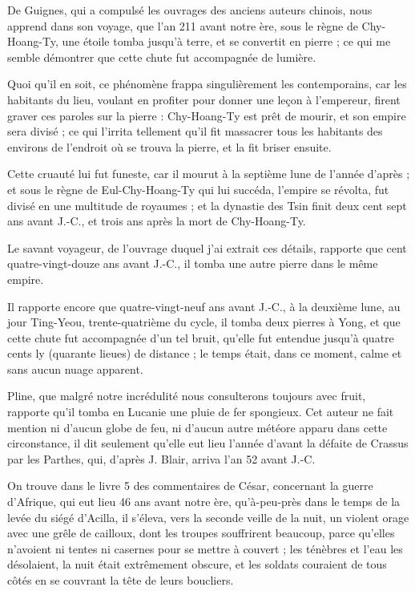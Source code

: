 \documentclass[a4paper, 12pt, oneside, french]{article}
\begin{document}
De Guignes, qui a compulsé les ouvrages des anciens auteurs chinois, nous apprend dans son voyage, que l'an 211 avant notre ère, sous le règne de Chy-Hoang-Ty, une étoile tomba jusqu'à terre, et se convertit en pierre ; ce qui me semble démontrer que cette chute fut accompagnée de lumière.

Quoi qu'il en soit, ce phénomène frappa singulièrement les contemporains, car les habitants du lieu, voulant en profiter pour donner une leçon à l'empereur, firent graver ces paroles sur la pierre : \og Chy-Hoang-Ty est prêt de mourir, et son empire sera divisé ; \fg ce qui l'irrita tellement qu'il fit massacrer tous les habitants des environs de l'endroit où se trouva la pierre, et la fit briser ensuite.

Cette cruauté lui fut funeste, car il mourut à la septième lune de l'année d'après ; et sous le règne de Eul-Chy-Hoang-Ty qui lui succéda, l'empire se révolta, fut divisé en une multitude de royaumes ; et la dynastie des Tsin finit deux cent sept ans avant J.-C., et trois ans après la mort de Chy-Hoang-Ty.

Le savant voyageur, de l'ouvrage duquel j'ai extrait ces détails, rapporte que cent quatre-vingt-douze ans avant J.-C., il tomba une autre pierre dans le même empire.

Il rapporte encore que quatre-vingt-neuf ans avant J.-C., à la deuxième lune, au jour Ting-Yeou, trente-quatrième du cycle, il tomba deux pierres à Yong, et que cette chute fut accompagnée d'un tel bruit, qu'elle fut entendue jusqu'à quatre cents ly (quarante lieues) de distance ; le temps était, dans ce moment, calme et sans aucun nuage apparent.

Pline, que malgré notre incrédulité nous consulterons toujours avec fruit, rapporte qu'il tomba en Lucanie une pluie de fer spongieux. Cet auteur ne fait mention ni d'aucun globe de feu, ni d'aucun autre météore apparu dans cette circonstance, il dit seulement qu'elle eut lieu l'année d'avant la défaite de Crassus par les Parthes, qui, d'après J. Blair, arriva l'an 52 avant J.-C.

On trouve dans le livre 5 des commentaires de César, concernant la guerre d'Afrique, qui eut lieu 46 ans avant notre ère, qu'à-peu-près dans le temps de la levée du siégé d'Acilla, il s'éleva, vers la seconde veille de la nuit, un violent orage avec une grêle de cailloux, dont les troupes souffrirent beaucoup, parce qu'elles n'avoient ni tentes ni casernes pour se mettre à couvert ; les ténèbres et l'eau les désolaient, la nuit était extrêmement obscure, et les soldats couraient de tous côtés en se couvrant la tête de leurs boucliers.
\end{document}

